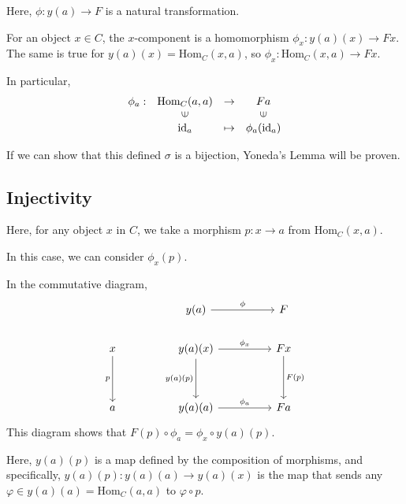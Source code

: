\documentclass[uplatex,a4j,12pt,dvipdfmx]{jsarticle}
\begin{document}
Here, $\phi: y(a) \to F$ is a natural transformation.

For an object $x \in C$, the $x$-component is a homomorphism $\phi_{x} : y(a)(x) \to Fx$.
The same is true for $y(a)(x)=\text{Hom}_{C}(x,a)$, so $\phi_{x} : \text{Hom}_{C}(x,a) \to Fx$.

In particular,
\[
	\begin{array}{cccc}
		\phi_{a} : & \text{Hom}_{C}(a,a)     & \to     & Fa                      \\
		           & \rotatebox{90}{${\in}$} &         & \rotatebox{90}{${\in}$} \\
		           & \text{id}_{a}           & \mapsto & \phi_{a}(\text{id}_{a})
	\end{array}
\]

If we can show that this defined $\sigma$ is a bijection, Yoneda's Lemma will be proven.

\subsection{Injectivity}

Here, for any object $x$ in $C$, we take a morphism $p: x \to a$ from $\text{Hom}_{C}(x,a)$.

In this case, we can consider $\phi_{x}(p)$.

In the commutative diagram,
\[
	\begin{tikzcd}
		&  & y(a) \arrow[rr, "\phi"]              &  & F                  \\
		x \arrow[dd, "p"'] &  & y(a)(x) \arrow[dd, "y(a)(p)"'] \arrow[rr, "\phi_{x}"] &  & Fx \arrow[dd, "F(p)"] \\
		&  &                                  &  &                    \\
		a                  &  & y(a)(a) \arrow[rr, "\phi_{a}"]     &  & Fa
	\end{tikzcd}
\]
This diagram shows that $F(p) \circ \phi_{a} = \phi_{x} \circ y(a)(p)$.

Here, $y(a)(p)$ is a map defined by the composition of morphisms, and specifically,
$y(a)(p): y(a)(a) \to y(a)(x)$ is the map that sends any $\varphi \in y(a)(a) = \text{Hom}_{C}(a,a)$ to $\varphi \circ p$.
\end{document}
